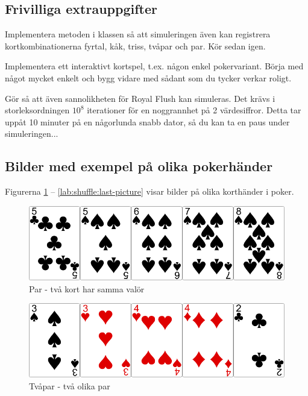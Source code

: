 \subsection{Frivilliga extrauppgifter}

\Task Implementera metoden  i klassen  så att simuleringen även kan registrera kortkombinationerna fyrtal, kåk, triss, tvåpar och par. Kör sedan  igen.


\Task Implementera ett interaktivt kortspel, t.ex. någon enkel pokervariant. Börja med något mycket enkelt och bygg vidare med sådant som du tycker verkar roligt.

\Task Gör så att även sannolikheten för Royal Flush kan simuleras. Det krävs i storleksordningen $10^8$ iterationer för en noggrannhet på 2 värdesiffror. Detta tar uppåt 10 minuter på en någorlunda snabb dator, så du kan ta en paus under simuleringen... 

\subsection{Bilder med exempel på olika pokerhänder}\label{shuffle:hands}

Figurerna \ref{lab:shuffle:first-picture} -- \ref{lab:shuffle:last-picture} visar bilder på olika korthänder i poker.

\begin{figure}[H]
 \begin{minipage}[c]{0.5\textwidth}
  \includegraphics[width=\textwidth]{../img/w05-hands/pair.png}
 \end{minipage}
 \begin{minipage}[c]{0.3\textwidth}
  \caption{Par - två kort har samma valör}
   \label{lab:shuffle:first-picture}
 \end{minipage}
\end{figure}

\begin{figure}[H]
 \begin{minipage}[c]{0.5\textwidth}
  \includegraphics[width=\textwidth]{../img/w05-hands/twopair.png}
 \end{minipage}
 \begin{minipage}[c]{0.3\textwidth}
  \caption{Tvåpar - två olika par}
 \end{minipage}
\end{figure}

